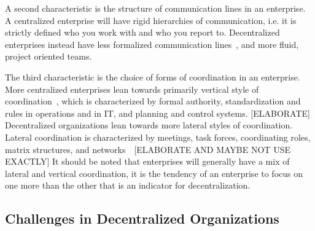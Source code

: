 A second characteristic is the structure of communication lines in an enterprise. A centralized enterprise will have rigid hierarchies of communication, i.e. it is strictly defined who you work with and who you report to. Decentralized enterprises instead have less formalized communication lines~\cite{pearlson2009}, and more fluid, project oriented teams.~\cite{Applegate1988a}

The third characteristic is the choice of forms of coordination in an enterprise. More centralized enterprises lean towards primarily vertical style of coordination~\cite{Bolman2008}, which is characterized by formal authority, standardization and rules in operations and in IT, and planning and control systems. [ELABORATE] Decentralized organizations lean towards more lateral styles of coordination. Lateral coordination is characterized by meetings, task forces, coordinating roles, matrix structures, and networks~~\cite{Bolman2008}[ELABORATE AND MAYBE NOT USE EXACTLY] It should be noted that enterprises will generally have a mix of lateral and vertical coordination, it is the tendency of an enterprise to focus on one more than the other that is an indicator for decentralization. 

%
%

\subsection{Challenges in Decentralized Organizations}

